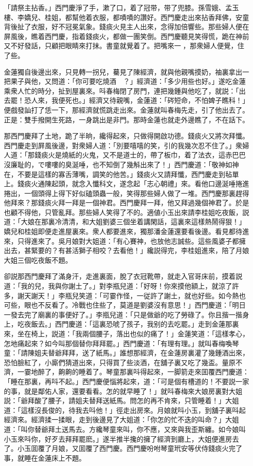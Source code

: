 「請祭主拈香。」西門慶淨了手，漱了口，着了冠带，带了兜膝。孫雪娥、孟玉樓、李嬌兒、桂姐，都幫他着衣服，都嘖嘖的讚好。西門慶走出來拈香拜佛，安童背後扯了衣服，好不冠冕氣象。錢痰火見主人出來，念得加倍響些。那些婦人便在屏風後，瞧着西門慶，指着錢痰火，都做一團笑倒。西門慶聽見笑得慌，跪在神前又不好發話，只顧把眼睛來打抹。書童就覺着了。把嘴來一𢫓，那衆婦人便覺，住了些。

金蓮獨自後邊出來，只見轉一拐兒，驀見了陳經濟，就與他親嘴摸奶，袖裏拿出一把果子與他，又問道：「你可要吃燒酒　？」經濟道：「多少用些也好。」遂吃金蓮乘衆人忙的時分，扯到屋裏來。呌春梅閉了房門，連把幾鍾與他吃了，就説：「出去罷！恐人來，我便死也。」經濟又待親嘴，金蓮道：「硶短命，不怕婢子瞧科！」便戲發訕打了恁一下，那經濟就慌跳走出來。金蓮就叫春梅先走，引了他出去了。正是：雙手撥開生死路，一身跳出是非門。那時金蓮也就走外邊瞧了，不在話下。

那西門慶拜了土地，跪了半晌，纔得起來，只做得開啟功德。錢痰火又將次拜懺。西門慶走到屛風後邊，對衆婦人道：「別要嘻嘻的笑，引的我幾次忍不住了。」衆婦人道：「那錢痰火是燒紙的火鬼，又不是道士的，帶了板巾，着了法衣，這赤巴巴沒廉耻的，で嘍嘍的臭涎唾，也不知倒了幾斛出來了！」西門慶道：「敬神如神在，不要是這樣的寡舌薄嘴，調笑的他苦。」錢痰火又請拜懺，西門慶走到毡單上。錢痰火通陳起頭，就念入懺科文，遂念起「志心朝禮」來。看他口邊涎唾捲進捲出，一個頭得上得下好似磕頭蟲一般，笑得那些婦人做了一堆。西門慶那裏趕得他拜來？那錢痰火拜一拜是一個神君。西門慶拜一拜，他又拜過幾個神君了。於是也顧不得他，只管亂拜。那些婦人笑得了不的。適値小玉出來請李桂姐吃夜飯，説道：「大娘在那裏冷清清，和大姐劉婆三個坐着講閑話，這裏來這樣熱鬧得狠！」嬌兒和桂姐即便走進屋裏來。衆人都要進來，獨那潘金蓮還要看後邊。看見都待進來，只得進來了。吳月娘對大姐道：「有心賽神，也放他志誠些。這些風婆子都擁出去，甚緊要的？有甚活獅子相咬？去看他！」纔説得完，李桂姐進來，陪了月娘大姐三個吃夜飯不題。

卻説那西門慶拜了滿身汗，走進裏面，脫了衣冠靴帶，就走入官哥床前，摸着説道：「我的兒，我與你謝土了。」對李瓶兒道：「好呀！你來摸他額上，就涼了許多，謝天謝天！」李瓶兒笑道：「可霎作怪，一従許了謝土，就也好些。如今熱也可些，眼也不反看了。冷戰也住些了，莫道是劉婆沒有意思！」西門慶道：「明日一發去完了廟裏的事便好了。」李瓶兒道：「只是做爺的吃了勞碌了。你且揩一揩身上，吃夜飯去。」西門慶道：「這裏恐唬了孩子，我别的去吃罷。」走到金蓮那裏來，坐在椅上，説道：「我兩個腰子，落出也似的痛了！」金蓮笑道：「這樣孝心，怎地痛起來？如今叫那個替你拜拜罷。」西門慶道：「有理有理。」就叫春梅喚琴童：「請陳姐夫替爺拜拜，送了紙馬。」誰想那經濟，在金蓮房裏灌了幾鍾酒出來，恐怕臉紅了，小廝們猜道出來，只得買了些淡酒，在舖子裏又吃了幾盃。量原不濟，一霎地醉了，齁齁的睡着了。琴童那裏呌得起來，一脚箭走來囬覆西門慶道：「睡在那裏，再呌不起。」西門慶便惱將起來，道：「可是個有槽道的！不要説一家的事，就是鄰佑人家，還要看看。怎的就早睡了！」就呌春梅來大娘房裏對大姐説：「爺拜酸了腰子，請姐夫替拜送紙馬。問怎的再不肯來，只管睡着！」大姐道：「這樣沒長俊的，待我去呌他！」徑走出房來。月娘就呌小玉，到舖子裏呌起經濟來。經濟揉一揉眼，走到後邊見了大姐道：「你怎的忙不迭的叫命？」大姐道：「叫你替爺拜土送馬去。方纔琴童來叫，你不應，又來與我歪斯纏。如今娘叫小玉來呌你，好歹去拜拜罷麽。」遂半推半攙的擁了經濟到廳上，大姐便進房去了。小玉囬覆了月娘，又囬覆了西門慶。西門慶吩咐琴童玳安等伏侍錢痰火完了事，就睡在金蓮床上不題。

